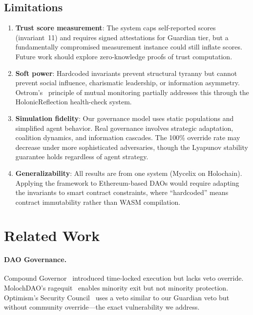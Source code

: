 \documentclass[11pt,a4paper]{article}
\begin{document}
\subsection{Limitations}

\begin{enumerate}
    \item \textbf{Trust score measurement}: The system caps self-reported scores (invariant~11) and requires signed attestations for Guardian tier, but a fundamentally compromised measurement instance could still inflate scores. Future work should explore zero-knowledge proofs of trust computation.
    \item \textbf{Soft power}: Hardcoded invariants prevent structural tyranny but cannot prevent social influence, charismatic leadership, or information asymmetry. Ostrom's~\cite{ostrom} principle of mutual monitoring partially addresses this through the HolonicReflection health-check system.
    \item \textbf{Simulation fidelity}: Our governance model uses static populations and simplified agent behavior. Real governance involves strategic adaptation, coalition dynamics, and information cascades. The 100\% override rate may decrease under more sophisticated adversaries, though the Lyapunov stability guarantee holds regardless of agent strategy.
    \item \textbf{Generalizability}: All results are from one system (Mycelix on Holochain). Applying the framework to Ethereum-based DAOs would require adapting the invariants to smart contract constraints, where ``hardcoded'' means contract immutability rather than WASM compilation.
\end{enumerate}

\section{Related Work}
\label{sec:related}

\paragraph{DAO Governance.} Compound Governor~\cite{compound} introduced time-locked execution but lacks veto override. MolochDAO's ragequit~\cite{moloch} enables minority exit but not minority protection. Optimism's Security Council~\cite{optimism} uses a veto similar to our Guardian veto but without community override---the exact vulnerability we address.
\end{document}
